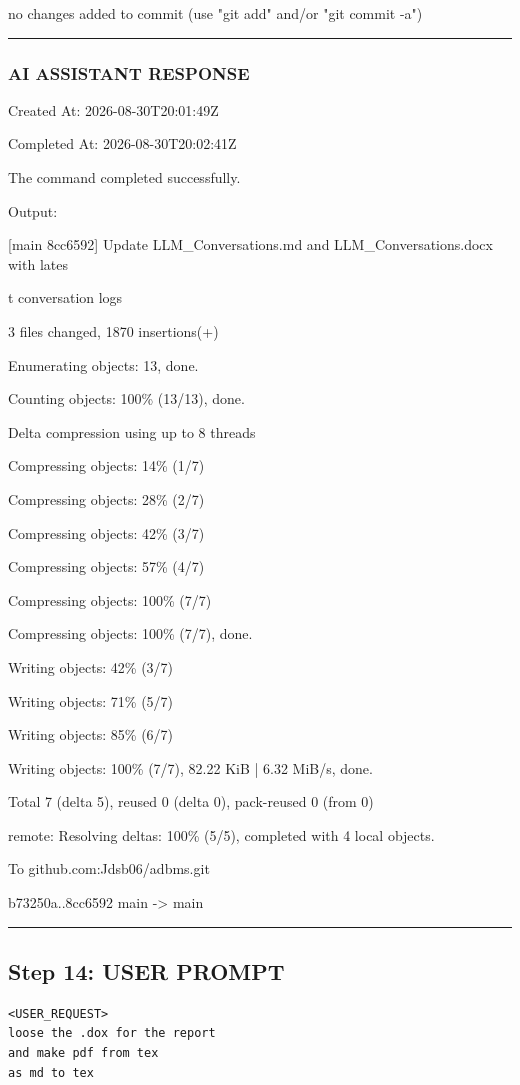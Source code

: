 \documentclass[11pt,a4paper]{article}
\begin{document}
{no changes added to commit (use "git add" and/or "git commit -a")


\hrule

\subsubsection{AI ASSISTANT RESPONSE}

Created At: 2026-08-30T20:01:49Z

Completed At: 2026-08-30T20:02:41Z


The command completed successfully.

Output:

[main 8cc6592] Update LLM\_Conversations.md and LLM\_Conversations.docx with lates

t conversation logs

3 files changed, 1870 insertions(+)

Enumerating objects: 13, done.

Counting objects: 100\% (13/13), done.

Delta compression using up to 8 threads

Compressing objects:  14\% (1/7)

Compressing objects:  28\% (2/7)

Compressing objects:  42\% (3/7)

Compressing objects:  57\% (4/7)

Compressing objects: 100\% (7/7)

Compressing objects: 100\% (7/7), done.

Writing objects:  42\% (3/7)

Writing objects:  71\% (5/7)

Writing objects:  85\% (6/7)

Writing objects: 100\% (7/7), 82.22 KiB | 6.32 MiB/s, done.

Total 7 (delta 5), reused 0 (delta 0), pack-reused 0 (from 0)

remote: Resolving deltas: 100\% (5/5), completed with 4 local objects.

To github.com:Jdsb06/adbms.git

b73250a..8cc6592  main -> main


\hrule

\subsection{Step 14: USER PROMPT}

\begin{lstlisting}[language=text]
<USER_REQUEST>
loose the .dox for the report 
and make pdf from tex 
as md to tex 


\end{lstlisting}}
\end{document}
